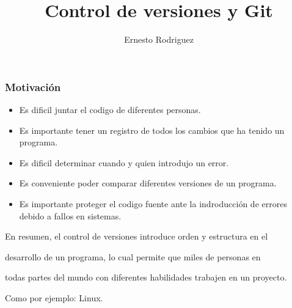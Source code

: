 \documentclass{beamer}
\title[Git]{Control de versiones y Git}
\author{Ernesto Rodriguez}
\institute{

    Universidad del Itsmo \\

    \medskip \textit{erodriguez@unis.edu.gt}

}
\date[\today]{}
\begin{document}
\begin{frame}

\titlepage

\end{frame}



\begin{frame}

    \frametitle{Motivaci\'on}

    \begin{itemize}

        \item{Es dificil juntar el codigo de diferentes personas.}

        \item{Es importante tener un registro de todos los cambios que ha tenido un programa.}

        \item{Es dificil determinar cuando y quien introdujo un error.}

        \item{Es conveniente poder comparar diferentes versiones de un programa.}

        \item{Es importante proteger el codigo fuente ante la indroducci\'on de errores debido a fallos en sistemas.}

    \end{itemize}

En resumen, el control de versiones introduce orden y estructura en el

desarrollo de un programa, lo cual permite que miles de personas en

todas partes del mundo con diferentes habilidades trabajen en un proyecto.

Como por ejemplo: Linux.

\end{frame}
\end{document}
